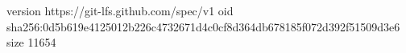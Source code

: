 version https://git-lfs.github.com/spec/v1
oid sha256:0d5b619e4125012b226c4732671d4c0cf8d364db678185f072d392f51509d3e6
size 11654
